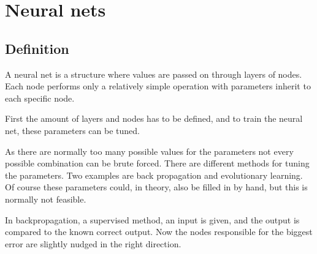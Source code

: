 \section{Neural nets}
\label{sec:NN}
\subsection{Definition}
A neural net is a structure where values are passed on through layers of nodes. Each node performs only a relatively simple operation with parameters inherit to each specific node.

First the amount of layers and nodes has to be defined, and to train the neural net, these parameters can be tuned.

As there are normally too many possible values for the parameters not every possible combination can be brute forced. There are different methods for tuning the parameters. Two examples are back propagation and evolutionary learning. Of course these parameters could, in theory, also be filled in by hand, but this is normally not feasible.

In backpropagation, a supervised method, an input is given, and the output is compared to the known correct output. Now the nodes responsible for the biggest error are slightly nudged in the right direction.
